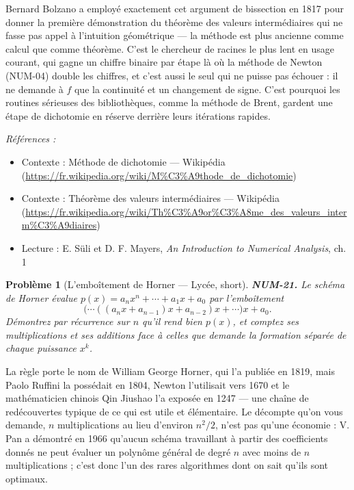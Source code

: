 \documentclass[11pt]{article}
\newtheorem{problem}{Problème}
\newenvironment{refs}{\par\small\noindent\emph{Références :}\begin{itemize}\setlength\itemsep{0pt}}{\end{itemize}\normalsize}
\begin{document}
\noindent Bernard Bolzano a employé exactement cet argument de bissection en 1817 pour donner la première démonstration du théorème des valeurs intermédiaires qui ne fasse pas appel à l'intuition géométrique --- la méthode est plus ancienne comme calcul que comme théorème. C'est le chercheur de racines le plus lent en usage courant, qui gagne un chiffre binaire par étape là où la méthode de Newton (NUM-04) double les chiffres, et c'est aussi le seul qui ne puisse pas échouer : il ne demande à $f$ que la continuité et un changement de signe. C'est pourquoi les routines sérieuses des bibliothèques, comme la méthode de Brent, gardent une étape de dichotomie en réserve derrière leurs itérations rapides.

\begin{refs}
\item Contexte : Méthode de dichotomie --- Wikipédia (\url{https://fr.wikipedia.org/wiki/M%C3%A9thode_de_dichotomie})
\item Contexte : Théorème des valeurs intermédiaires --- Wikipédia (\url{https://fr.wikipedia.org/wiki/Th%C3%A9or%C3%A8me_des_valeurs_interm%C3%A9diaires})
\item Lecture : E. Süli et D. F. Mayers, \textit{An Introduction to Numerical Analysis}, ch. 1
\end{refs}

\bigskip

\begin{problem}[{L'emboîtement de Horner --- Lycée, short}]
\textbf{NUM-21.} Le schéma de Horner évalue $p(x) = a_n x^n + \cdots + a_1 x + a_0$ par l'emboîtement
\[ \big( \cdots ((a_n x + a_{n-1})x + a_{n-2})x + \cdots \big) x + a_0 . \]
Démontrez par récurrence sur $n$ qu'il rend bien $p(x)$, et comptez ses multiplications et ses additions face à celles que demande la formation séparée de chaque puissance $x^k$.
\end{problem}

\noindent La règle porte le nom de William George Horner, qui l'a publiée en 1819, mais Paolo Ruffini la possédait en 1804, Newton l'utilisait vers 1670 et le mathématicien chinois Qin Jiushao l'a exposée en 1247 --- une chaîne de redécouvertes typique de ce qui est utile et élémentaire. Le décompte qu'on vous demande, $n$ multiplications au lieu d'environ $n^2/2$, n'est pas qu'une économie : V. Pan a démontré en 1966 qu'aucun schéma travaillant à partir des coefficients donnés ne peut évaluer un polynôme général de degré $n$ avec moins de $n$ multiplications ; c'est donc l'un des rares algorithmes dont on sait qu'ils sont optimaux.
\end{document}

